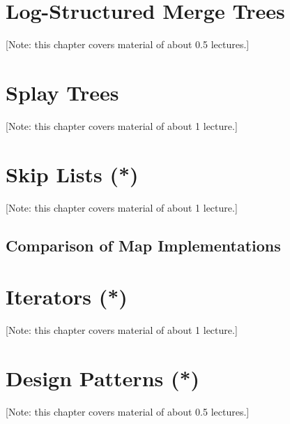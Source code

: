 \documentclass{book}
\begin{document}


\chapter{Log-Structured Merge Trees}
\label{chap:LSM}
[Note: this chapter covers material of about 0.5 lectures.]



\chapter{Splay Trees}
\label{chap:splay-trees}
[Note: this chapter covers material of about 1 lecture.]



\chapter{Skip Lists (*)}
\label{chap:skip-lists}
[Note: this chapter covers material of about 1 lecture.]



\section{Comparison of Map Implementations}
\label{sec:map-comparison}



\chapter{Iterators (*)}
\label{chap:iterators}
[Note: this chapter covers material of about 1 lecture.]



\chapter{Design Patterns (*)}
\label{chap:design-patterns}
[Note: this chapter covers material of about 0.5 lectures.]



\end{document}
